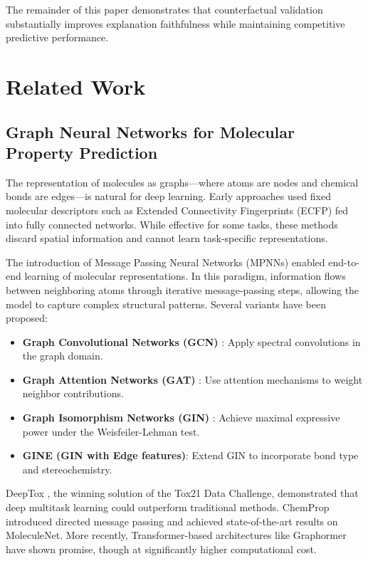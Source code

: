 \documentclass[conference]{IEEEtran}
\begin{document}
The remainder of this paper demonstrates that counterfactual validation substantially improves explanation faithfulness while maintaining competitive predictive performance.

\section{Related Work}

\subsection{Graph Neural Networks for Molecular Property Prediction}

The representation of molecules as graphs---where atoms are nodes and chemical bonds are edges---is natural for deep learning. Early approaches used fixed molecular descriptors such as Extended Connectivity Fingerprints (ECFP) \cite{rogers2010extended} fed into fully connected networks. While effective for some tasks, these methods discard spatial information and cannot learn task-specific representations.

The introduction of Message Passing Neural Networks (MPNNs) \cite{gilmer2017neural} enabled end-to-end learning of molecular representations. In this paradigm, information flows between neighboring atoms through iterative message-passing steps, allowing the model to capture complex structural patterns. Several variants have been proposed:

\begin{itemize}
    \item \textbf{Graph Convolutional Networks (GCN)} \cite{kipf2017semi}: Apply spectral convolutions in the graph domain.
    \item \textbf{Graph Attention Networks (GAT)} \cite{veličković2018graph}: Use attention mechanisms to weight neighbor contributions.
    \item \textbf{Graph Isomorphism Networks (GIN)} \cite{xu2019powerful}: Achieve maximal expressive power under the Weisfeiler-Lehman test.
    \item \textbf{GINE (GIN with Edge features)}: Extend GIN to incorporate bond type and stereochemistry.
\end{itemize}

DeepTox \cite{mayr2016deeptox}, the winning solution of the Tox21 Data Challenge, demonstrated that deep multitask learning could outperform traditional methods. ChemProp \cite{yang2019analyzing} introduced directed message passing and achieved state-of-the-art results on MoleculeNet. More recently, Transformer-based architectures like Graphormer \cite{ying2021transformers} have shown promise, though at significantly higher computational cost.
\end{document}
